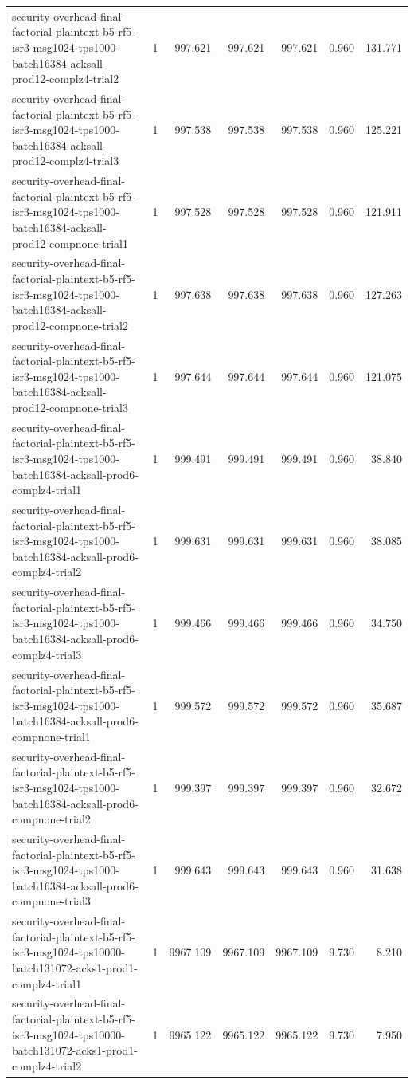 \begin{tabular}{lrrrrrr}
security-overhead-final-factorial-plaintext-b5-rf5-isr3-msg1024-tps1000-batch16384-acksall-prod12-complz4-trial2 & 1 & 997.621 & 997.621 & 997.621 & 0.960 & 131.771 \\
security-overhead-final-factorial-plaintext-b5-rf5-isr3-msg1024-tps1000-batch16384-acksall-prod12-complz4-trial3 & 1 & 997.538 & 997.538 & 997.538 & 0.960 & 125.221 \\
security-overhead-final-factorial-plaintext-b5-rf5-isr3-msg1024-tps1000-batch16384-acksall-prod12-compnone-trial1 & 1 & 997.528 & 997.528 & 997.528 & 0.960 & 121.911 \\
security-overhead-final-factorial-plaintext-b5-rf5-isr3-msg1024-tps1000-batch16384-acksall-prod12-compnone-trial2 & 1 & 997.638 & 997.638 & 997.638 & 0.960 & 127.263 \\
security-overhead-final-factorial-plaintext-b5-rf5-isr3-msg1024-tps1000-batch16384-acksall-prod12-compnone-trial3 & 1 & 997.644 & 997.644 & 997.644 & 0.960 & 121.075 \\
security-overhead-final-factorial-plaintext-b5-rf5-isr3-msg1024-tps1000-batch16384-acksall-prod6-complz4-trial1 & 1 & 999.491 & 999.491 & 999.491 & 0.960 & 38.840 \\
security-overhead-final-factorial-plaintext-b5-rf5-isr3-msg1024-tps1000-batch16384-acksall-prod6-complz4-trial2 & 1 & 999.631 & 999.631 & 999.631 & 0.960 & 38.085 \\
security-overhead-final-factorial-plaintext-b5-rf5-isr3-msg1024-tps1000-batch16384-acksall-prod6-complz4-trial3 & 1 & 999.466 & 999.466 & 999.466 & 0.960 & 34.750 \\
security-overhead-final-factorial-plaintext-b5-rf5-isr3-msg1024-tps1000-batch16384-acksall-prod6-compnone-trial1 & 1 & 999.572 & 999.572 & 999.572 & 0.960 & 35.687 \\
security-overhead-final-factorial-plaintext-b5-rf5-isr3-msg1024-tps1000-batch16384-acksall-prod6-compnone-trial2 & 1 & 999.397 & 999.397 & 999.397 & 0.960 & 32.672 \\
security-overhead-final-factorial-plaintext-b5-rf5-isr3-msg1024-tps1000-batch16384-acksall-prod6-compnone-trial3 & 1 & 999.643 & 999.643 & 999.643 & 0.960 & 31.638 \\
security-overhead-final-factorial-plaintext-b5-rf5-isr3-msg1024-tps10000-batch131072-acks1-prod1-complz4-trial1 & 1 & 9967.109 & 9967.109 & 9967.109 & 9.730 & 8.210 \\
security-overhead-final-factorial-plaintext-b5-rf5-isr3-msg1024-tps10000-batch131072-acks1-prod1-complz4-trial2 & 1 & 9965.122 & 9965.122 & 9965.122 & 9.730 & 7.950 \\

\end{tabular}
